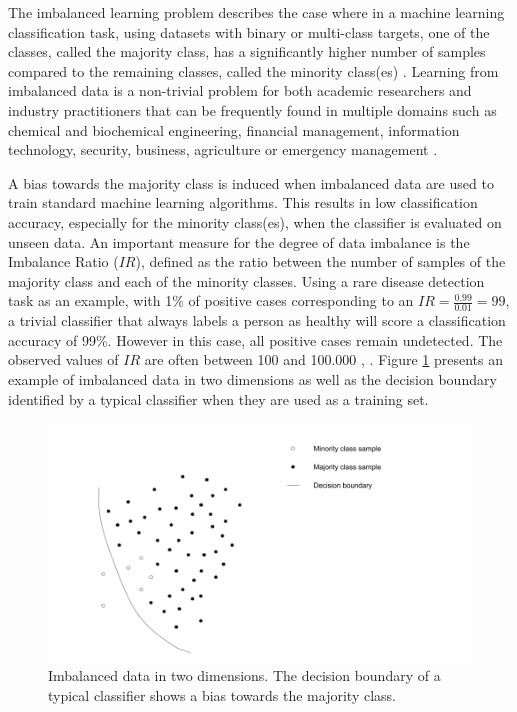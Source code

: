 \documentclass[preprint,12pt, a4paper]{elsarticle}
\begin{document}
The imbalanced learning problem describes the case where in a machine learning classification task, using datasets with binary or multi-class targets, one of the classes, called the majority class, has a significantly higher number of samples compared to the remaining classes, called the minority class(es) \cite{Chawla2003}. Learning from imbalanced data is a non-trivial problem for both academic researchers and industry practitioners that can be frequently found in multiple domains such as chemical and biochemical engineering, financial management, information technology, security, business, agriculture or emergency management \cite{Haixiang2017}.

A bias towards the majority class is induced when imbalanced data are used to train standard machine learning algorithms. This results in low classification accuracy, especially for the minority class(es), when the classifier is evaluated on unseen data. An important measure for the degree of data imbalance is the Imbalance Ratio ($IR$), defined as the ratio between the number of samples of the majority class and each of the minority classes. Using a rare disease detection task as an example, with 1\% of positive cases corresponding to an $IR=\frac{0.99}{0.01}=99$, a trivial classifier that always labels a person as healthy will score a classification accuracy of 99\%. However in this case, all positive cases remain undetected. The observed values of $IR$ are often between 100 and 100.000 \cite{Chawla2002}, \cite{Barua2014}. Figure \ref{fig:imbalanced} presents an example of imbalanced data in two dimensions as well as the decision boundary identified by a typical classifier when they are used as a training set.

\begin{figure}[H]
	\centering
	\includegraphics[width=14cm, keepaspectratio]{../analysis/imbalanced_problem}
	\caption{Imbalanced data in two dimensions. The decision boundary of a typical classifier shows a bias towards the majority class.}
	\label{fig:imbalanced}
\end{figure}
\end{document}
